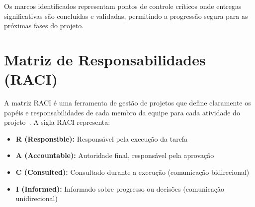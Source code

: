 Os marcos identificados representam pontos de controle críticos onde entregas significativas são concluídas e validadas, permitindo a progressão segura para as próximas fases do projeto.

\section{Matriz de Responsabilidades (RACI)}

A matriz RACI é uma ferramenta de gestão de projetos que define claramente os papéis e responsabilidades de cada membro da equipe para cada atividade do projeto~\cite{PMI:2021}. A sigla RACI representa:

\begin{itemize}
    \item \textbf{R (Responsible):} Responsável pela execução da tarefa
    \item \textbf{A (Accountable):} Autoridade final, responsável pela aprovação
    \item \textbf{C (Consulted):} Consultado durante a execução (comunicação bidirecional)
    \item \textbf{I (Informed):} Informado sobre progresso ou decisões (comunicação unidirecional)
\end{itemize}

